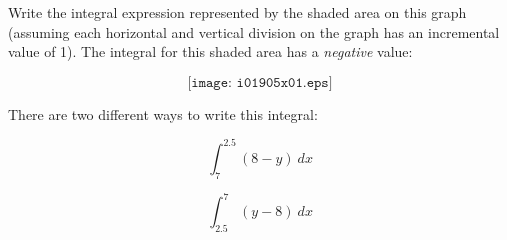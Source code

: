 

Write the integral expression represented by the shaded area on this graph (assuming each horizontal and vertical division on the graph has an incremental value of 1).  The integral for this shaded area has a {\it negative} value:

$$\texttt{[image: i01905x01.eps]}$$







There are two different ways to write this integral:

$$\int_{7}^{2.5} (8 - y) \> dx$$

$$\int_{2.5}^{7} (y - 8) \> dx$$











